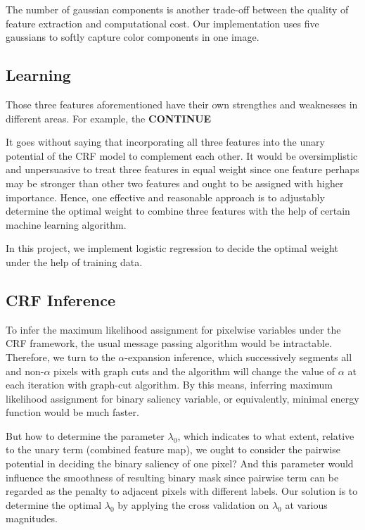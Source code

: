 \documentclass[10pt,twocolumn,letterpaper]{article}
\newcommand{\BOLD}{\textbf}
\begin{document}
The number of gaussian components is another trade-off between the quality of 
feature extraction and computational cost. Our implementation uses five gaussians 
to softly capture color components in one image. 


\subsection{Learning}
Those three features aforementioned have their own strengthes and weaknesses in 
different areas. For example, the \BOLD{CONTINUE}

It goes without saying that incorporating all three features into the unary potential of the CRF model to complement each other. It would be oversimplistic and unpersuasive to treat three features in equal weight since one feature perhaps may be stronger than other two features and ought to be assigned with higher importance. Hence, one effective and reasonable approach is to adjustably determine the optimal weight to combine three features with the help of certain machine learning algorithm. 

In this project, we implement logistic regression to decide the optimal weight under the help of training data.

\subsection{CRF Inference}
To infer the maximum likelihood assignment for pixelwise variables under the CRF framework, the usual message passing algorithm would be intractable. Therefore, we turn to the $\alpha$-expansion inference,
which successively segments all and non-$\alpha$ pixels with graph cuts and the algorithm will change the value of $\alpha$ at each iteration with graph-cut algorithm. By this means, inferring maximum likelihood assignment for binary saliency variable, or equivalently, 
 minimal energy function would be much faster. 

But how to determine the parameter $\lambda_0$, which indicates to what extent, relative to the unary term (combined feature map), we ought to consider the pairwise potential in deciding the binary saliency of one pixel? And this parameter would influence the smoothness of resulting binary mask since pairwise term can be regarded as the penalty to adjacent pixels with different labels. Our solution is to determine the optimal $\lambda_0$ by applying the cross validation on $\lambda_0$ at various magnitudes. 
\end{document}
